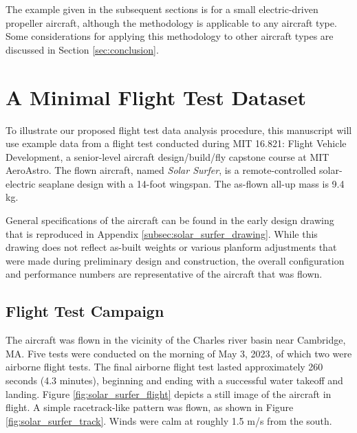\documentclass[conf]{new-aiaa}
\begin{document}
    The example given in the subsequent sections is for a small electric-driven propeller aircraft, although the methodology is applicable to any aircraft type. Some considerations for applying this methodology to other aircraft types are discussed in Section \ref{sec:conclusion}.

    \section{A Minimal Flight Test Dataset}

    To illustrate our proposed flight test data analysis procedure, this manuscript will use example data from a flight test conducted during MIT 16.821: Flight Vehicle Development, a senior-level aircraft design/build/fly capstone course at MIT AeroAstro. The flown aircraft, named \emph{Solar Surfer}, is a remote-controlled solar-electric seaplane design with a 14-foot wingspan. The as-flown all-up mass is 9.4 kg.

    General specifications of the aircraft can be found in the early design drawing that is reproduced in Appendix \ref{subsec:solar_surfer_drawing}. While this drawing does not reflect as-built weights or various planform adjustments that were made during preliminary design and construction, the overall configuration and performance numbers are representative of the aircraft that was flown.

    \subsection{Flight Test Campaign}

    The aircraft was flown in the vicinity of the Charles river basin near Cambridge, MA. Five tests were conducted on the morning of May 3, 2023, of which two were airborne flight tests. The final airborne flight test lasted approximately 260 seconds (4.3 minutes), beginning and ending with a successful water takeoff and landing. Figure \ref{fig:solar_surfer_flight} depicts a still image of the aircraft in flight. A simple racetrack-like pattern was flown, as shown in Figure \ref{fig:solar_surfer_track}. Winds were calm at roughly 1.5 m/s from the south.
\end{document}
